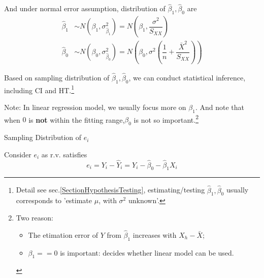      And under normal error assumption, distribution of $ \hat{\beta} _1,\hat{\beta} _0  $ are
    \begin{align*}
        \hat{\beta }_1&\sim N(\beta _1,\sigma^2_{\hat{\beta}_1}) =N(\beta_1,\dfrac{\sigma^2}{S_{XX}})\\
        \hat{\beta}_0&\sim N(\beta_0,\sigma^2_{\hat{\beta }_0}) =N(\beta_0,\sigma^2(\dfrac{1}{n}+\dfrac{\bar{X}^2}{S_{XX}}))
    \end{align*}
    
    Based on sampling distribution of $ \hat{\beta} _1,\hat{\beta} _0  $, we can conduct statistical inference, including CI and HT.\footnote{Detail see sec.\ref{SectionHypothesisTesting}, estimating/testing $ \hat{\beta} _1,\hat{\beta} _0  $ usually corresponds to 'estimate $ \mu $, with $ \sigma^2 $ unknown'.}
    
        
       
    
    Note: In linear regression model, we usually focus more on $ \beta_1 $. And note that when $ 0 $ is \textbf{not} within the fitting range,$ \beta_0 $ is not so important.\footnote{Two reason:\begin{itemize}[topsep=2pt,itemsep=2pt]
        \item The etimation error of $ Y $ from $ \hat{\beta}_1 $ increases with $ X_h-\bar{X} $;
        \item $ \beta_1==0  $ is important: decides whether linear model can be used. 
    \end{itemize}}


\begin{point}
    Sampling Distribution of $ e_i $ 
\end{point}
    Consider $ e_i $ as r.v. satisfies
    \begin{equation}
        e_i= Y_i-\hat{Y}_i=Y_i-\hat{\beta }_0-\hat{\beta }_1X_i
    \end{equation}

